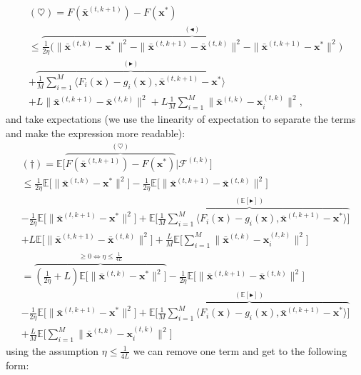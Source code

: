 \begin{align*}
    (\heartsuit)  = F(\bar{\bm{x}}^{(t,k+1)}) - F(\bm{x}^*) \\ \leq \overbrace{ \frac{1}{2\eta} \Big(\|  \bar{\bm{x}}^{(t,k)} - \bm{x}^{*} \|^2 - \|  \bar{\bm{x}}^{(t,k+1)} - \bar{\bm{x}}^{(t,k)} \|^2 - \| \bar{\bm{x}}^{(t,k+1)} - \bm{x}^{*} \|^2 \Big)}^{(\blacktriangleleft)} \\
    + \overbrace{\frac{1}{M} \sum_{i=1}^M  \langle F_i(\bm{x}) - g_i(\bm{x})  ,\bar{\bm{x}}^{(t,k+1)} - \bm{x}^{*} \rangle  }^{(\blacktriangleright)}
    \\+ L  \|\bar{\bm{x}}^{(t,k+1)}-\bar{\bm{x}}^{(t,k)} \|^2  +L \frac{1}{M} \sum_{i=1}^M \|\bar{\bm{x}}^{(t,k)}-\bm{x}_i^{(t,k)} \|^2,
\end{align*}
\noindent
and take expectations (we use the linearity of expectation to separate the terms and make the expression more readable):
\begin{align*}
    (\dagger) = \mathbb{E} \Big[ \overbrace{F(\bar{\bm{x}}^{(t,k+1)}) - F(\bm{x}^*)}^{(\heartsuit)} | \mathcal{F}^{(t,k)}\Big]\\
    \leq \frac{1}{2\eta} \mathbb{E} \Bigg[
    \|  \bar{\bm{x}}^{(t,k)} - \bm{x}^{*} \|^2 \Bigg]
    -  \frac{1}{2\eta} \mathbb{E} \Bigg[ \|  \bar{\bm{x}}^{(t,k+1)} - \bar{\bm{x}}^{(t,k)} \|^2 \Bigg] \\
    - \frac{1}{2\eta}  \mathbb{E} \Bigg[ \| \bar{\bm{x}}^{(t,k+1)} - \bm{x}^{*} \|^2  \Bigg] 
    +  \overbrace{\mathbb{E} \Bigg[ \frac{1}{M} \sum_{i=1}^M  \langle F_i(\bm{x}) - g_i(\bm{x})  ,\bar{\bm{x}}^{(t,k+1)} - \bm{x}^{*} \rangle    \Bigg] }^{(\mathbb{E}[\blacktriangleright])}
    \\+ L \mathbb{E} \Bigg[ \|\bar{\bm{x}}^{(t,k+1)}-\bar{\bm{x}}^{(t,k)} \|^2  \Bigg]  + \frac{L}{M}  \mathbb{E} \Bigg[ \sum_{i=1}^M \|\bar{\bm{x}}^{(t,k)}-\bm{x}_i^{(t,k)} \|^2 \Bigg] \\
    = \overbrace{\left(\frac{1}{2\eta} + L \right) \mathbb{E} \Bigg[ 
        \|  \bar{\bm{x}}^{(t,k)} - \bm{x}^{*} \|^2 \Bigg]}^{\geq 0 \iff \eta \leq \frac{1}{4L}}
    -  \frac{1}{2\eta} \mathbb{E} \Bigg[  \|  \bar{\bm{x}}^{(t,k+1)} - \bar{\bm{x}}^{(t,k)} \|^2 \Bigg] \\
    - \frac{1}{2\eta}  \mathbb{E} \Bigg[  \| \bar{\bm{x}}^{(t,k+1)} - \bm{x}^{*} \|^2  \Bigg] 
    +  \overbrace{\mathbb{E} \Bigg[ \frac{1}{M} \sum_{i=1}^M  \langle F_i(\bm{x}) - g_i(\bm{x})  ,\bar{\bm{x}}^{(t,k+1)} - \bm{x}^{*} \rangle    \Bigg] }^{(\mathbb{E}[\blacktriangleright])}
    \\+ \frac{L}{M}  \mathbb{E} \Bigg[ \sum_{i=1}^M \|\bar{\bm{x}}^{(t,k)}-\bm{x}_i^{(t,k)} \|^2 \Bigg] 
\end{align*}
using the assumption $\eta \leq \frac{1}{4L}$ we can remove one term and get to the following form: 

